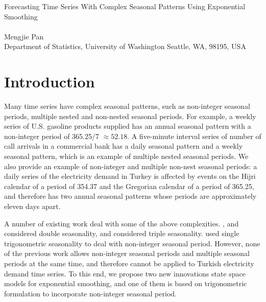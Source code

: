 \documentclass{uwstat572}
\begin{document}

\begin{center}
  {\LARGE Forecasting Time Series With Complex Seasonal Patterns Using Exponential Smoothing}\\\ \\
  {Mengjie Pan \\ 
    Department of Statistics, University of Washington Seattle, WA, 98195, USA
  }
\end{center}




\section{Introduction}

\hspace{4ex}Many time series have complex seasonal patterns, such as non-integer seasonal periods, multiple nested and non-nested seasonal periods. For example, a weekly series of U.S. gasoline products supplied has an annual seasonal pattern with a non-integer period of 365.25/7 $\approx 52.18$. A five-minute interval series of number of call arrivals in a commercial bank has a daily seasonal pattern and a weekly seasonal pattern, which is an example of multiple nested seasonal periods. We also provide an example of non-integer and multiple non-nest seasonal periods: a daily series of the electricity demand in Turkey is affected by events on the Hijri calendar of a period of 354.37 and the Gregorian calendar of a period of 365.25, and therefore has two annual seasonal patterns whose periods are approximately eleven days apart. 

A number of existing work deal with some of the above complexities. \citet{pedregal2006modulated}, \citet{harvey1993forecasting} and \citet{taylor2003short} considered double seasonality, and \citet{taylor2010triple} considered triple seasonality. \citet{harvey1997modeling} used single trigonometric seasonality to deal with non-integer seasonal period. However, none of the previous work allows non-integer seasonal periods and multiple seasonal periods at the same time, and therefore cannot be applied to Turkish electricity demand time series. To this end, we propose two new innovations state space models for exponential smoothing, and one of them is based on trigonometric formulation to incorporate non-integer seasonal period. 
\end{document}
